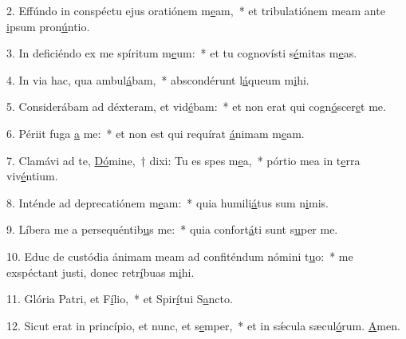 2. Effúndo in conspéctu ejus oratiónem m\uline{e}am,~* et tribulatiónem meam ante \uline{i}psum pron\uline{ú}ntio.\par 
3. In deficiéndo ex me spíritum m\uline{e}um:~* et tu cognovísti s\uline{é}mitas m\uline{e}as.\par 
4. In via hac, qua ambul\uline{á}bam,~* abscondérunt l\uline{á}queum m\uline{i}hi.\par 
5. Considerábam ad déxteram, et vid\uline{é}bam:~* et non erat qui cogn\uline{ó}scer\uline{e}t me.\par 
6. Périit fuga \uline{a} me:~* et non est qui requírat \uline{á}nimam m\uline{e}am.\par 
7. Clamávi ad te, \uline{Dó}mine,~† dixi: Tu es spes m\uline{e}a,~* pórtio mea in t\uline{e}rra viv\uline{é}ntium.\par 
8. Inténde ad deprecatiónem m\uline{e}am:~* quia humili\uline{á}tus sum n\uline{i}mis.\par 
9. Líbera me a persequéntib\uline{u}s me:~* quia confort\uline{á}ti sunt s\uline{u}per me.\par 
10. Educ de custódia ánimam meam ad confiténdum nómini t\uline{u}o:~* me exspéctant justi, donec retr\uline{í}buas m\uline{i}hi.\par 
11. Glória Patri, et F\uline{í}lio,~* et Spir\uline{í}tui S\uline{a}ncto.\par 
12. Sicut erat in princípio, et nunc, et s\uline{e}mper,~* et in sǽcula sæcul\uline{ó}rum. \uline{A}men.\par 

